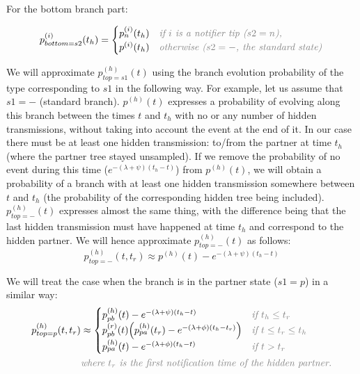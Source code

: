 \documentclass[10pt,letterpaper]{article}
\begin{document}
For the bottom branch part: 

\begin{equation}
p_{bottom=s2}^{(i)}(t_h) = 
\begin{cases}
p_n^{(i)}(t_h)&\textit{\color{gray} if $i$ is a notifier tip ($s2=n$),}\\
p^{(i)}(t_h)&\textit{\color{gray} otherwise ($s2=-$, the standard state)}\\
\end{cases}
\end{equation}

We will approximate $p_{top=s1}^{(h)}(t)$ using the branch evolution probability of the type corresponding to $s1$  in the following way. For example, let us assume that $s1=-$ (standard branch). $p^{(h)}(t)$ expresses a probability of evolving along this branch between the times $t$ and $t_h$ with no or any number of hidden transmissions, without taking into account the event at the end of it. In our case there must be at least one hidden transmission: to/from the partner at time $t_h$ (where the partner tree stayed unsampled). If we remove the probability of no event during this time ($e^{-(\lambda + \psi)(t_h - t)}$) from $p^{(h)}(t)$, we will obtain a probability of a branch with at least one hidden transmission somewhere between $t$ and $t_h$ (the probability of the corresponding hidden tree being included). $p_{top=-}^{(h)}(t)$ expresses almost the same thing, with the difference being that the last hidden transmission must have happened at time $t_h$ and correspond to the hidden partner. %
We will hence approximate $p_{top=-}^{(h)}(t)$ as follows: 
\begin{equation}
p_{top=-}^{(h)}(t, t_r) \approx p^{(h)}(t) -e^{-(\lambda + \psi)(t_{h} - t)}
\end{equation}

We will treat the case when the branch is in the partner state ($s1=p$) in a similar way:
\begin{equation}
\begin{split}
p_{top=p}^{(h)}(t, t_r) &\approx 
\begin{cases}
p_{pb}^{(h)}(t) -e^{-(\lambda + \psi)(t_{h} - t)}&\textit{\color{gray} if $t_h \leq t_r$}\\
p_{pb}^{(r)}(t)\Big(p_{pa}^{(h)}(t_r) -e^{-(\lambda + \phi)(t_{h} - t_r)}\Big)&\textit{\color{gray} if $t \leq t_r \leq t_h$}\\
p_{pa}^{(h)}(t) -e^{-(\lambda + \phi)(t_{h} - t)}&\textit{\color{gray} if $t > t_r$}\\
\end{cases}\\
&\textit{\color{gray}where $t_r$ is the first notification time of the hidden partner.}\\
\end{split}
\end{equation}
\end{document}

